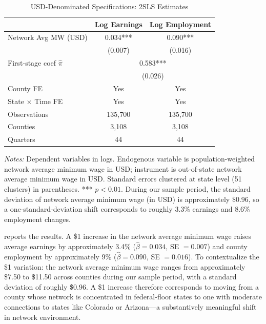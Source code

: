 \documentclass[12pt]{article}
\begin{document}
\begin{table}[t]
\centering
\caption{USD-Denominated Specifications: 2SLS Estimates}
\label{tab:usd}
\begin{threeparttable}
\begin{tabular}{lcc}
\toprule
 & Log Earnings & Log Employment \\
\midrule
Network Avg MW (USD) & 0.034*** & 0.090*** \\
 & (0.007) & (0.016) \\[0.5em]
\addlinespace
First-stage coef $\hat{\pi}$ & \multicolumn{2}{c}{0.583***} \\
 & \multicolumn{2}{c}{(0.026)} \\
\addlinespace
County FE & Yes & Yes \\
State $\times$ Time FE & Yes & Yes \\
Observations & 135,700 & 135,700 \\
Counties & 3,108 & 3,108 \\
Quarters & 44 & 44 \\
\bottomrule
\end{tabular}
\begin{tablenotes}[flushleft]
\small
\item \textit{Notes:} Dependent variables in logs. Endogenous variable is population-weighted network average minimum wage in USD; instrument is out-of-state network average minimum wage in USD. Standard errors clustered at state level (51 clusters) in parentheses. *** $p<0.01$. During our sample period, the standard deviation of network average minimum wage (in USD) is approximately \$0.96, so a one-standard-deviation shift corresponds to roughly 3.3\% earnings and 8.6\% employment changes.
\end{tablenotes}
\end{threeparttable}
\end{table}

 reports the results. A \$1 increase in the network average minimum wage raises average earnings by approximately 3.4\% ($\hat{\beta} = 0.034$, SE $= 0.007$) and county employment by approximately 9\% ($\hat{\beta} = 0.090$, SE $= 0.016$). To contextualize the \$1 variation: the network average minimum wage ranges from approximately \$7.50 to \$11.50 across counties during our sample period, with a standard deviation of roughly \$0.96. A \$1 increase therefore corresponds to moving from a county whose network is concentrated in federal-floor states to one with moderate connections to states like Colorado or Arizona---a substantively meaningful shift in network environment.
\end{document}
